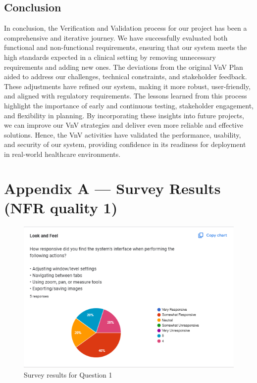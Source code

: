 \documentclass[12pt, titlepage]{article}
\begin{document}
\subsection*{Conclusion}
  In conclusion, the Verification and Validation process for our project has been a comprehensive and iterative journey. We have successfully evaluated both functional and non-functional requirements, ensuring that our system meets the high standards expected in a clinical setting by removing unnecessary requirements and adding new ones. The deviations from the original VnV Plan aided to address our challenges, technical constraints, and stakeholder feedback. These adjustments have refined our system, making it more robust, user-friendly, and aligned with regulatory requirements.
  \noindent The lessons learned from this process highlight the importance of early and continuous testing, stakeholder engagement, and flexibility in planning. By incorporating these insights into future projects, we can improve our VnV strategies and deliver even more reliable and effective solutions.
  \noindent Hence, the VnV activities have validated the performance, usability, and security of our system, providing confidence in its readiness for deployment in real-world healthcare environments.

  \newpage
  \section*{Appendix A --- Survey Results (NFR quality 1)}\label{appendix:A}
  
  \begin{figure}[ht!] 
    \centering
    \includegraphics[scale=1.3]{../assets/s1.png}
    \caption{Survey results for Question 1}
    \label{fig:survey1}
  \end{figure}
  
\end{document}
